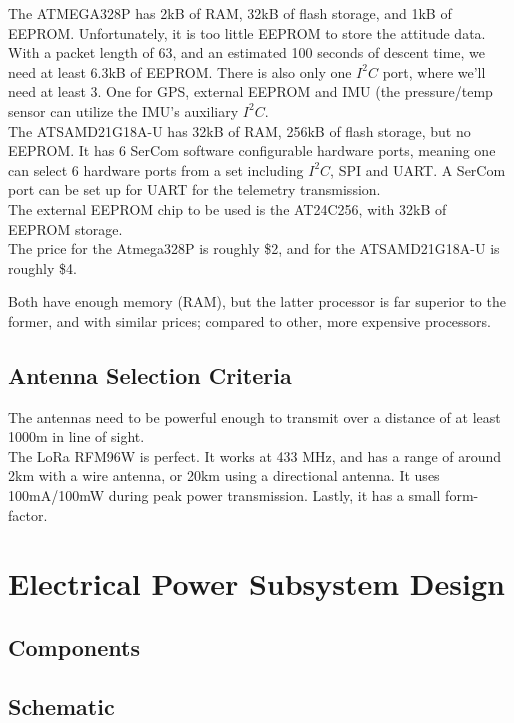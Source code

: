 The ATMEGA328P\cite{uno} has 2kB of RAM, 32kB of flash storage, and 1kB of EEPROM. Unfortunately, it is too little EEPROM to store the attitude data. With a packet length of 63, and an estimated 100 seconds of descent time, we need at least 6.3kB of EEPROM. There is also only one $I^2C$ port, where we'll need at least 3. One for GPS, external EEPROM and IMU (the pressure/temp sensor can utilize the IMU's auxiliary $I^2C$.\\

The ATSAMD21G18A-U\cite{cpu} has 32kB of RAM, 256kB of flash storage, but no EEPROM. It has 6 SerCom software configurable hardware ports, meaning one can select 6 hardware ports from a set including $I^2C$, SPI and UART. A SerCom port can be set up for UART for the telemetry transmission. \\

The external EEPROM chip to be used is the AT24C256\cite{eeprom}, with 32kB of EEPROM storage.\\

The price\cite{findchips} for the Atmega328P is roughly \$2, and for the ATSAMD21G18A-U is roughly \$4.

Both have enough memory (RAM), but the latter processor is far superior to the former, and with similar prices; compared to other, more expensive processors.

\subsection{Antenna Selection Criteria}

The antennas need to be powerful enough to transmit over a distance of at least 1000m in line of sight.\\

The LoRa RFM96W\cite{lora} is perfect. It works at 433 MHz, and has a range of around 2km with a wire antenna, or 20km using a directional antenna. It uses 100mA/100mW during peak power transmission. Lastly, it has a small form-factor.

\newpage

\section{Electrical Power Subsystem Design}
\subsection{Components}
\subsection{Schematic}
